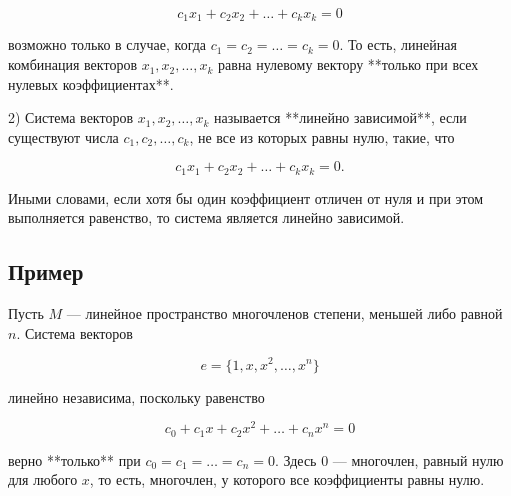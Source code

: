 {\[
c_1 x_1 + c_2 x_2 + \dots + c_k x_k = 0
\]



возможно только в случае, когда \( c_1 = c_2 = \dots = c_k = 0 \). То есть, линейная комбинация векторов \( x_1, x_2, \dots, x_k \) равна нулевому вектору **только при всех нулевых коэффициентах**.

2) Система векторов \( x_1, x_2, \dots, x_k \) называется **линейно зависимой**, если существуют числа \( c_1, c_2, \dots, c_k \), не все из которых равны нулю, такие, что 



\[
c_1 x_1 + c_2 x_2 + \dots + c_k x_k = 0.
\]



Иными словами, если хотя бы один коэффициент отличен от нуля и при этом выполняется равенство, то система является линейно зависимой.

\subsection*{Пример}

Пусть \( M \) — линейное пространство многочленов степени, меньшей либо равной \( n \). Система векторов 



\[
e = \{ 1, x, x^2, \dots, x^n \}
\]



линейно независима, поскольку равенство 



\[
c_0 + c_1 x + c_2 x^2 + \dots + c_n x^n = 0
\]



верно **только** при \( c_0 = c_1 = \dots = c_n = 0 \). Здесь \( 0 \) — многочлен, равный нулю для любого \( x \), то есть, многочлен, у которого все коэффициенты равны нулю.


}